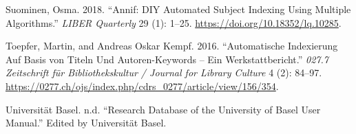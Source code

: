 \begin{CSLReferences}{1}{0}
\leavevmode\hypertarget{ref-Suominen.2018}{}%
Suominen, Osma. 2018. {``Annif: DIY Automated Subject Indexing Using
Multiple Algorithms.''} \emph{LIBER Quarterly} 29 (1): 1--25.
\url{https://doi.org/10.18352/lq.10285}.

\leavevmode\hypertarget{ref-Toepfer.2016}{}%
Toepfer, Martin, and Andreas Oskar Kempf. 2016. {``Automatische
Indexierung Auf Basis von Titeln Und Autoren-Keywords -- Ein
Werkstattbericht.''} \emph{027.7 Zeitschrift f{ü}r Bibliothekskultur /
Journal for Library Culture} 4 (2): 84--97.
\url{https://0277.ch/ojs/index.php/cdrs_0277/article/view/156/354}.

\leavevmode\hypertarget{ref-UniversitatBasel.2021}{}%
Universität Basel. n.d. {``Research Database of the University of Basel
User Manual.''} Edited by Universität Basel.

\end{CSLReferences}
